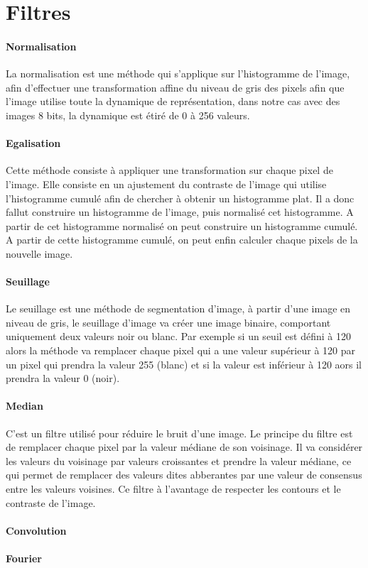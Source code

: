 \section{Filtres}
	
	\paragraph{Normalisation}
	\label{Normalisation}
	La normalisation est une méthode qui s'applique sur l'histogramme de l'image, afin d'effectuer une transformation affine du niveau de gris des pixels afin que l'image utilise toute la dynamique de représentation, dans notre cas avec des images 8 bits, la dynamique est étiré de 0 à 256 valeurs.


	\paragraph{Egalisation}

	\label{Egalisation}
	Cette méthode consiste à appliquer une transformation sur chaque pixel de l'image. Elle consiste en un ajustement du contraste de l'image qui utilise l'histogramme cumulé afin de chercher à obtenir un histogramme plat. Il a donc fallut construire un histogramme de l'image, puis normalisé cet histogramme. A partir de cet histogramme normalisé on peut construire un histogramme cumulé. A partir de cette histogramme cumulé, on peut enfin calculer chaque pixels de la nouvelle image.

	
	\paragraph{Seuillage}
	\label{Seuillage}

	Le seuillage est une méthode de segmentation d'image, à partir d'une image en niveau de gris, le seuillage d'image va créer une image binaire, comportant uniquement deux valeurs noir ou blanc. Par exemple si un seuil est défini à 120 alors la méthode va remplacer chaque pixel qui a une valeur supérieur à 120 par un pixel qui prendra la valeur 255  (blanc) et si la valeur est inférieur à 120 aors il prendra la valeur 0 (noir).

	\paragraph{Median}
	\label{Median}

	C'est un filtre utilisé pour réduire le bruit d'une image. Le principe du filtre est de remplacer chaque pixel par la valeur médiane de son voisinage. Il va considérer les valeurs du voisinage par valeurs croissantes et prendre la valeur médiane, ce qui permet de remplacer des valeurs dites abberantes par une valeur de consensus entre les valeurs voisines. Ce filtre à l'avantage de respecter les contours et le contraste de l'image.

	\paragraph{Convolution}
	\label{Convolution}


	\paragraph{Fourier}
	\label{Fourier}


